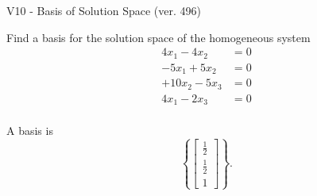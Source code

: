 \begin{exercise}
  \begin{exerciseTitle}V10 - Basis of Solution Space (ver. 496)\end{exerciseTitle}
  \begin{exerciseStatement}
    Find a basis for the solution space of the homogeneous system 
\begin{align*}
 4 x_ 1 -4 x_ 2 &= 0  \\ 
  -5 x_ 1 + 5 x_ 2 &= 0  \\ 
  + 10 x_ 2 -5 x_ 3 &= 0  \\ 
  4 x_ 1 -2 x_ 3 &= 0  \\ 
 \end{align*}


 
  \end{exerciseStatement}

  \begin{exerciseAnswer}
   A basis is   
\[\left\{\left[\begin{array}{c}
\frac{1}{2} \\
\frac{1}{2} \\
1
\end{array}\right]\right\}.\]

  


  \end{exerciseAnswer}
\end{exercise}